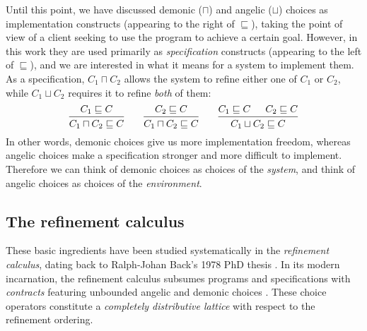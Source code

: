 \documentclass[11pt,oneside,draft]{book}
\theoremstyle{definition}
\begin{document}
Until this point,
we have discussed demonic ($\sqcap$) and angelic ($\sqcup$) choices
as implementation constructs
(appearing to the right of $\sqsubseteq$),
taking the point of view of a client
seeking to use the program to achieve a certain goal.
However,
in this work they are used primarily
as \emph{specification} constructs
(appearing to the left of $\sqsubseteq$),
and we are interested in what it means
for a system to implement them.
%
As a specification, $C_1 \sqcap C_2$
allows the system to refine either one of $C_1$ or $C_2$, while
$C_1 \sqcup C_2$ requires it to refine
\emph{both} of them:
\[
  \begin{prooftree}
    \hypo{C_1 \sqsubseteq C}
    \infer1{C_1 \sqcap C_2 \sqsubseteq C}
  \end{prooftree}
  \qquad
  \begin{prooftree}
    \hypo{C_2 \sqsubseteq C}
    \infer1{C_1 \sqcap C_2 \sqsubseteq C}
  \end{prooftree}
  \qquad
  \begin{prooftree}
    \hypo{C_1 \sqsubseteq C}
    \hypo{C_2 \sqsubseteq C}
    \infer2{C_1 \sqcup C_2 \sqsubseteq C}
  \end{prooftree}
\]
In other words,
demonic choices
give us more
implementation freedom,
whereas angelic choices make a specification
stronger and more difficult to implement.
Therefore we can think of demonic choices as
choices of the \emph{system}, %
and think of angelic choices as
choices of the \emph{environment}.


\subsection{The refinement calculus} %

These basic ingredients have been studied systematically
in the \emph{refinement calculus},
dating back to Ralph-Johan Back's 1978 PhD thesis \citep{backthesis}.
In its modern incarnation,
the refinement calculus
subsumes programs and specifications with \emph{contracts}
featuring unbounded angelic and demonic choices \citep{refcal}.
These choice operators
constitute a \emph{completely distributive lattice}
with respect to the refinement ordering.
\end{document}
